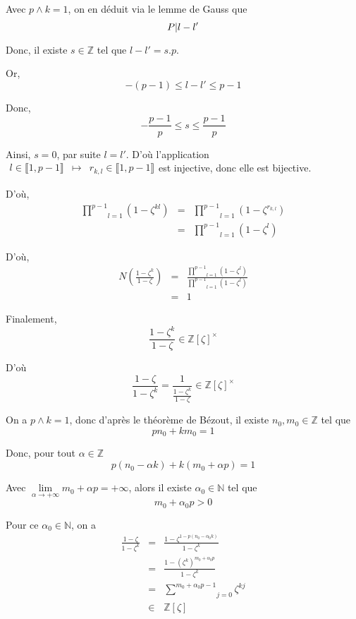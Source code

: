 Avec $p \wedge k = 1$, on en d{\'e}duit via le lemme de Gauss que
\[ P | l - l'  \]


Donc, il existe $s \in \mathbb{Z}$ tel que $l - l' = s.p$.

Or,
\[ - (p - 1) \leqslant l - l' \leqslant p - 1 \]


Donc,
\[ - \frac{p - 1}{p} \leqslant s \leqslant \frac{p - 1}{p} \]


Ainsi, $s = 0$, par suite $l = l'$. D'o{\`u} l'application$\begin{array}{lll}
  l \in \llbracket 1, p - 1 \rrbracket & \longmapsto & r_{k, l} \in \llbracket
  1, p - 1 \rrbracket
\end{array}$est injective, donc elle est bijective.

D'o{\`u},
\begin{eqnarray*}
  \underset{l = 1}{\overset{p - 1}{\prod}}  (1 - \zeta^{k l}) & = &
  \underset{l = 1}{\overset{p - 1}{\prod}}  (1 - \zeta^{r_{k, l}})\\
  & = & \underset{l = 1}{\overset{p - 1}{\prod}}  (1 - \zeta^l)
\end{eqnarray*}


D'o{\`u},
\begin{eqnarray*}
  N \left( \frac{1 - \zeta^k}{1 - \zeta} \right) & = & \frac{\underset{l =
  1}{\overset{p - 1}{\prod}}  (1 - \zeta^l)}{\underset{l = 1}{\overset{p -
  1}{\prod}}  (1 - \zeta^l)}\\
  & = & 1
\end{eqnarray*}


Finalement,
\[ \frac{1 - \zeta^k}{1 - \zeta} \in \mathbb{Z} [\zeta]^{\times} \]


D'o{\`u}
\[ \frac{1 - \zeta }{1 - \zeta^k} = \frac{1}{\frac{1 - \zeta^k}{1 - \zeta}}
   \in \mathbb{Z} [\zeta]^{\times} \]


{}

On a $p \wedge k = 1$, donc d'apr{\`e}s le th{\'e}or{\`e}me de B{\'e}zout, il
existe $n_0, m_0 \in \mathbb{Z}$ tel que
\[ p n_0 + k m_0 = 1 \]


Donc, pour tout $\alpha \in \mathbb{Z}$
\[ p (n_0 - \alpha k) + k (m_0 + \alpha p) = 1 \]


Avec $\underset{\alpha \rightarrow + \infty}{\lim} m_0 + \alpha p = + \infty$,
alors il existe $\alpha_0 \in \mathbb{N}$ tel que
\[ m_0 + \alpha_0 p > 0 \]


Pour ce $\alpha_0 \in \mathbb{N}$, on a
\begin{eqnarray*}
  \frac{1 - \zeta}{1 - \zeta^k} & = & \frac{1 - \zeta^{1 - p (n_0 - \alpha_0
  k)}}{1 - \zeta^k}\\
  & = & \frac{1 - \left( {\zeta^k}  \right)^{m_0 + \alpha_0 p}}{1 -
  \zeta^k}\\
  & = & \underset{j = 0}{\overset{m_0 + \alpha_0 p - 1}{\sum}} \zeta^{k j}\\
  & \in & \mathbb{Z} [\zeta]
\end{eqnarray*}


